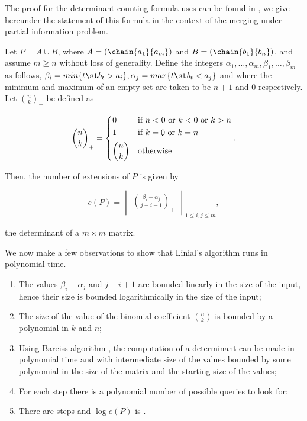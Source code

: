 The proof for the determinant counting formula \citet*{linial:1984} uses can be
found in \citet*{mohanty:1979}, we give hereunder the statement of this formula
in the context of the merging under partial information problem.

\begin{theorem}
Let \(P = A \cup B\), where \(A = (\chain{a_1}{a_m})\) and \(B =
(\chain{b_1}{b_n})\), and assume \(m \ge n\) without loss of generality. Define
the integers \(\alpha_1,\ldots,\alpha_m,\beta_1,\ldots,\beta_m\) as follows,
\(\beta_i = min\{t \st b_t > a_i\}, \alpha_j = max\{t \st b_t < a_j\}\) and
where the minimum and maximum of an empty set are taken to be \(n + 1\) and
\(0\) respectively. Let \(\binom{n}{k}_{+}\) be defined as

\begin{displaymath}
\binom{n}{k}_{+} =
\begin{dcases*}
0            & if  \(n < 0\)  or \(k < 0\)  or \(k > n\)\\
1            & if \(k = 0\)  or \(k = n\)\\
\binom{n}{k} & otherwise\\
\end{dcases*}.
\end{displaymath}

Then, the number of extensions of \(P\) is given by

\begin{displaymath}
e(P) =
\begin{vmatrix}
\binom{\beta_i - \alpha_j}{j - i - 1}_{+}
\end{vmatrix}_{1 \le i , j \le m},
\end{displaymath}

the determinant of a \(m \times m\) matrix.
\end{theorem}

We now make a few observations to show that Linial's algorithm runs in
polynomial time.

\begin{enumerate}
\item The values \(\beta_i - \alpha_j\) and \(j - i + 1\) are bounded
linearly in the size of the input, hence their size is bounded
logarithmically in the size of the input;
\item The size of the value of the binomial coefficient \(\binom{n}{k}\) is
bounded by a polynomial in \(k\) and \(n\);
\item Using Bareiss algorithm \cite{bareiss:1968}, the computation of a
determinant can be made in polynomial time and with intermediate size of the
values bounded by some polynomial in the size of the matrix and the starting
size of the values;
\item For each step there is a polynomial number of possible queries to look for;
\item There are  steps and \(\log e(P)\) is .
\end{enumerate}

